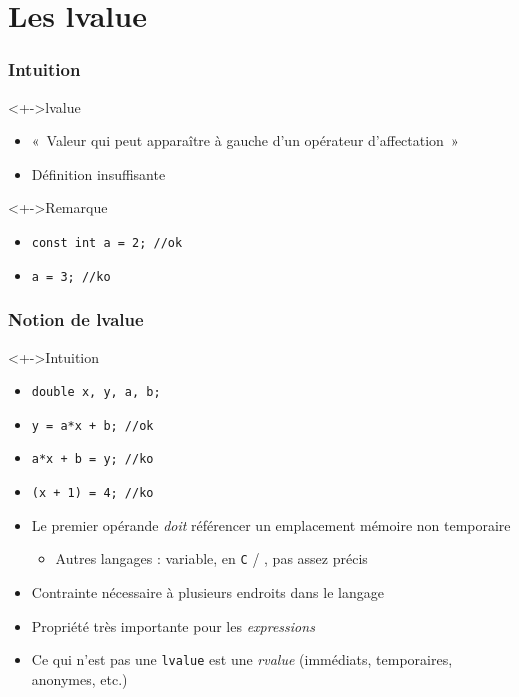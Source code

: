 \section{Les lvalue}

\begin{frame}
\frametitle{Intuition}
\begin{exampleblock}<+->{lvalue}
	\begin{itemize}[<+->]
	\item «~Valeur qui peut apparaître à gauche d'un opérateur d'affectation~»
	\end{itemize}
\end{exampleblock}
\begin{itemize}[<+->]
\item Définition insuffisante
\end{itemize}
\begin{alertblock}<+->{Remarque}
	\begin{itemize}[<+->]
	\item \lstinline|const int a = 2; //ok|
	\item \lstinline|a = 3; //ko|
	\end{itemize}
\end{alertblock}
\end{frame}

\begin{frame}
\frametitle{Notion de lvalue}
\begin{exampleblock}<+->{Intuition}
	\begin{itemize}[<+->]
	\item \lstinline|double x, y, a, b;|
	\item \lstinline|y = a*x + b; //ok|
	\item \lstinline|a*x + b = y; //ko|
	\item \lstinline|(x + 1) = 4; //ko|
	\end{itemize}
\end{exampleblock}
\begin{itemize}[<+->]
\item Le premier opérande \emph{doit} référencer un emplacement mémoire non temporaire
	\begin{itemize}
	\item Autres langages : variable, en \texttt{C} / \cpp, pas assez précis
	\end{itemize}
\item Contrainte nécessaire à plusieurs endroits dans le langage %
\item Propriété très importante pour les \emph{expressions}
\item Ce qui n'est pas une \texttt{lvalue} est une \emph{rvalue} (immédiats, temporaires, anonymes, etc.)
\end{itemize}
\end{frame}

